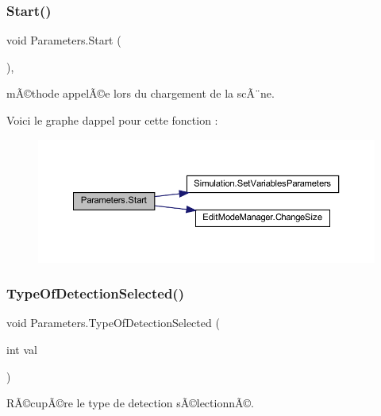 \subsubsection{\texorpdfstring{Start()}{Start()}}
{\footnotesize\ttfamily void Parameters.\+Start (\begin{DoxyParamCaption}{ }\end{DoxyParamCaption})\hspace{0.3cm}{\ttfamily [inline]}, {\ttfamily [private]}}



mÃ©thode appelÃ©e lors du chargement de la scÃ¨ne. 

Voici le graphe d\textquotesingle{}appel pour cette fonction \+:
\nopagebreak
\begin{figure}[H]
\begin{center}
\leavevmode
\includegraphics[width=350pt]{class_parameters_aa31bc8929b4008944bd7f720bfac9a62_cgraph}
\end{center}
\end{figure}
\mbox{\label{class_parameters_aea7e3963fed0681d7a9f756a5deb52d1}} 
\subsubsection{\texorpdfstring{Type\+Of\+Detection\+Selected()}{TypeOfDetectionSelected()}}
{\footnotesize\ttfamily void Parameters.\+Type\+Of\+Detection\+Selected (\begin{DoxyParamCaption}\item[{int}]{val }\end{DoxyParamCaption})\hspace{0.3cm}{\ttfamily [inline]}}



RÃ©cupÃ©re le type de detection sÃ©lectionnÃ©. 


